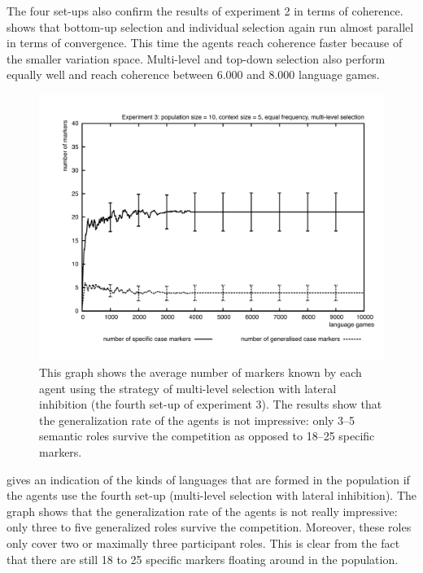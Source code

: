 The four set-ups also confirm the results of experiment 2 in terms of coherence.  shows that bottom-up selection and individual selection again run almost parallel in terms of convergence. This time the agents reach coherence faster because of the smaller variation space. Multi-level and top-down selection also perform equally well and reach coherence between 6.000 and 8.000 language games.

\begin{figure}[t]
\centerline{\includegraphics[width=\textwidth]{Chapter4/figs/markers3}}
  \caption[Experiment 3: number of markers]{This graph shows the average number of markers known by each agent using the strategy of multi-level selection with lateral inhibition (the fourth set-up of experiment 3). The results show that the generalization rate of the agents is not impressive: only 3--5 semantic roles survive the competition as opposed to 18--25 specific markers.}
   \label{f:markers3}
\end{figure}

 gives an indication of the kinds of languages that are formed in the population if the agents use the fourth set-up (multi-level selection with lateral inhibition). The graph shows that the generalization rate of the agents is not really impressive: only three to five generalized roles survive the competition. Moreover, these roles only cover two or maximally three participant roles. This is clear from the fact that there are still 18 to 25 specific markers floating around in the population.

